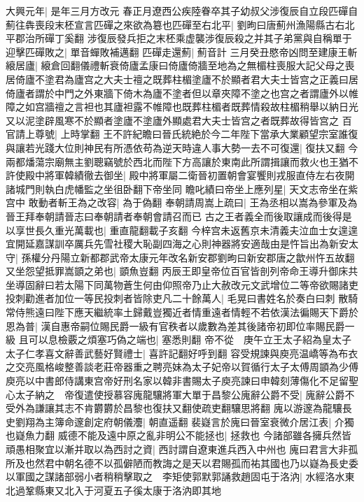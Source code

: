 大興元年|{
	是年三月方改元}
春正月遼西公疾陸眷卒其子幼叔父涉復辰自立段匹磾自薊往犇喪段末柸宣言匹磾之來欲為簒也匹磾至右北平|{
	劉昫曰唐薊州漁陽縣古右北平郡治所磾丁奚翻}
涉復辰發兵拒之末柸乘虚襲涉復辰殺之并其子弟黨與自稱單于迎擊匹磾敗之|{
	單音蟬敗補邁翻}
匹磾走還薊|{
	薊音計}
三月癸丑愍帝凶問至建康王斬縗居廬|{
	縗倉回翻儀禮斬衰倚廬孟康曰倚廬倚牆至地為之無楣柱喪服大記父母之喪居倚廬不塗君為廬宫之大夫士䄠之既葬柱楣塗廬不於顯者君大夫士皆宫之正義曰居倚廬者謂於中門之外東牆下倚木為廬不塗者但以章夾障不塗之也宫之者謂廬外以帷障之如宫牆䄠之言袒也其廬袒露不帷障也既葬柱楣者既葬情殺故柱楣稍舉以納日光又以泥塗辟風寒不於顯者塗廬不塗廬外顯處君大夫士皆宫之者既葬故得皆宫之}
百官請上尊號|{
	上時掌翻}
王不許紀瞻曰晉氏統絶於今二年陛下當承大業顧望宗室誰復與讓若光踐大位則神民有所憑依苟為逆天時違人事大勢一去不可復還|{
	復扶又翻}
今兩都燔蕩宗廟無主劉聰竊號於西北而陛下方高讓於東南此所謂揖讓而救火也王猶不許使殿中將軍韓績徹去御坐|{
	殿中將軍屬二衛晉初置朝會宴饗則戎服直侍左右夜開諸城門則執白虎幡監之坐徂卧翻下帝坐同}
瞻叱績曰帝坐上應列星|{
	天文志帝坐在紫宫中}
敢動者斬王為之改容|{
	為于偽翻}
奉朝請周嵩上疏曰|{
	王為丞相以嵩為參軍及為晉王拜奉朝請晉志曰奉朝請者奉朝會請召而已}
古之王者義全而後取讓成而後得是以享世長久重光萬載也|{
	重直龍翻載子亥翻}
今梓宫未返舊京未清義夫泣血士女遑遑宜開延嘉謀訓卒厲兵先雪社稷大恥副四海之心則神器將安適哉由是忤旨出為新安太守|{
	孫權分丹陽立新都郡武帝太康元年改名新安郡劉昫曰新安郡唐之歙州忤五故翻}
又坐怨望抵罪嵩顗之弟也|{
	顗魚豈翻}
丙辰王即皇帝位百官皆剖列帝命王導升御床共坐導固辭曰若太陽下同萬物蒼生何由仰照帝乃止大赦改元文武增位二等帝欲賜諸吏投刺勸進者加位一等民投刺者皆除吏凡二十餘萬人|{
	毛晃曰書姓名於奏白曰刺}
散騎常侍熊遠曰陛下應天繼統率土歸戴豈獨近者情重遠者情輕不若依漢法徧賜天下爵於恩為普|{
	漢自惠帝嗣位賜民爵一級有官秩者以歲數為差其後諸帝初即位率賜民爵一級}
且可以息檢覈之煩塞巧偽之端也|{
	塞悉則翻}
帝不從　庚午立王太子紹為皇太子太子仁孝喜文辭善武藝好賢禮士|{
	喜許記翻好呼到翻}
容受規諫與庾亮温嶠等為布衣之交亮風格峻整善談老莊帝器重之聘亮妹為太子妃帝以賀循行太子太傅周顗為少傅庾亮以中書郎侍講東宫帝好刑名家以韓非書賜太子庾亮諫曰申韓刻薄傷化不足留聖心太子納之　帝復遣使授慕容廆龍驤將軍大單于昌黎公廆辭公爵不受|{
	廆辭公爵不受外為謙讓其志不肯欝欝於昌黎也復扶又翻使疏吏翻驤思將翻}
廆以游邃為龍驤長史劉翔為主簿命邃創定府朝儀灋|{
	朝直遥翻}
裴嶷言於廆曰晉室衰微介居江表|{
	介獨也嶷魚力翻}
威德不能及遠中原之亂非明公不能拯也|{
	拯救也}
今諸部雖各擁兵然皆頑愚相聚宜以漸并取以為西討之資|{
	西討謂自遼東進兵西入中州也}
廆曰君言大非孤所及也然君中朝名德不以孤僻陋而教誨之是天以君賜孤而祐其國也乃以嶷為長史委以軍國之謀諸部弱小者稍稍擊取之　李矩使郭默郭誦救趙固屯于洛汭|{
	水經洛水東北過鞏縣東又北入于河夏五子徯太康于洛汭即其地}
